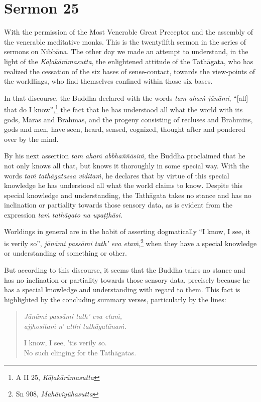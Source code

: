 \chapter{Sermon 25}

\NibbanaOpeningQuote

With the permission of the Most Venerable Great Preceptor and the assembly of the venerable meditative monks. This is the twentyfifth sermon in the series of sermons on Nibbāna. The other day we made an attempt to understand, in the light of the \emph{Kāḷakārāmasutta}, the enlightened attitude of the Tathāgata, who has realized the cessation of the six bases of sense-contact, towards the view-points of the worldlings, who find themselves confined within those six bases.

In that discourse, the Buddha declared with the words \emph{tam ahaṁ jānāmi}, ``[all] that do I know'',\footnote{A II 25, \emph{Kāḷakārāmasutta}} the fact that he has understood all what the world with its gods, Māras and Brahmas, and the progeny consisting of recluses and Brahmins, gods and men, have seen, heard, sensed, cognized, thought after and pondered over by the mind.

By his next assertion \emph{tam ahaṁ abbhaññāsiṁ}, the Buddha proclaimed that he not only knows all that, but knows it thoroughly in some special way. With the words \emph{taṁ tathāgatassa viditaṁ}, he declares that by virtue of this special knowledge he has understood all what the world claims to know. Despite this special knowledge and understanding, the Tathāgata takes no stance and has no inclination or partiality towards those sensory data, as is evident from the expression \emph{taṁ tathāgato na upaṭṭhāsi.}

Worldings in general are in the habit of asserting dogmatically ``I know, I see, it is verily so'', \emph{jānāmi passāmi tath' eva etaṁ},\footnote{Sn 908, \emph{Mahāviyūhasutta}} when they have a special knowledge or understanding of something or other.

But according to this discourse, it seems that the Buddha takes no stance and has no inclination or partiality towards those sensory data, precisely because he has a special knowledge and understanding with regard to them. This fact is highlighted by the concluding summary verses, particularly by the lines:

\begin{quote}
\emph{Jānāmi passāmi tath' eva etaṁ,}\\
\emph{ajjhositaṁ n' atthi tathāgatānaṁ.}

I know, I see, 'tis verily so.\\
No such clinging for the Tathāgatas.
\end{quote}

